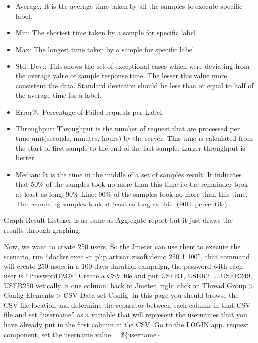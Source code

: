 \documentclass[letterpaper,10pt,english]{sphinxmanual}
\begin{document}
\begin{itemize}
\item {} 
Average: It is the average time taken by all the samples to execute specific label.

\item {} 
Min: The shortest time taken by a sample for specific label.

\item {} 
Max: The longest time taken by a sample for specific label

\item {} 
Std. Dev.: This shows the set of exceptional cases which were deviating from the average value of sample response time. The lesser this value more consistent the data. Standard deviation should be less than or equal to half of the average time for a label.

\item {} 
Error\%: Percentage of Failed requests per Label.

\item {} 
Throughput: Throughput is the number of request that are processed per time unit(seconds, minutes, hours) by the server. This time is calculated from the start of first sample to the end of the last sample. Larger throughput is better.

\item {} 
Median: It is the time in the middle of a set of samples result. It indicates that 50\% of the samples took no more than this time i.e the remainder took at least as long.
90\% Line: 90\% of the samples took no more than this time. The remaining samples took at least as long as this. (90th percentile)

\end{itemize}

Graph Result Listener is as same as Aggregate report but it just draws the results through graphing.


Now, we want to create 250 users, So the Jmeter can use them to execute the scenario, run “docker exec -it  php artisan zisoft:demo 250 1 100”, that command will create 250 users in a 100 days duration campaign, the password with each user is “Password123@”
Create a CSV file and put USER1, USER2 …..USER249, USER250 vetically in one column. back to Jmeter, right click on Thread Group \textendash{}\textgreater{} Config Elements \textendash{}\textgreater{} CSV Data set Config.
In this page you should browse the CSV file location and determine the separator between each column in that CSV file and set “username” as a  variable that will represent the usernames that you have already put in the first column in the CSV.
Go to the LOGIN app. request component, set the username value = \$\{username\}
\end{document}
